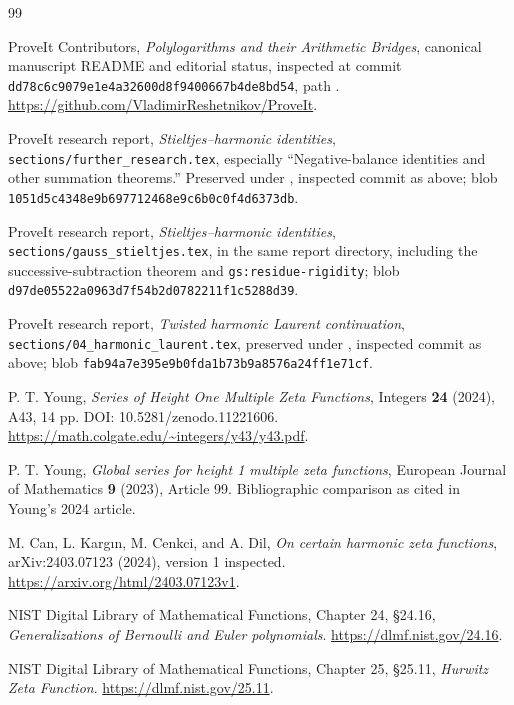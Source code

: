 \documentclass[11pt]{article}
\numberwithin{equation}{section}
\theoremstyle{definition}\newtheorem{definition}[theorem]{Definition}
\theoremstyle{remark}\newtheorem{remark}[theorem]{Remark}
\newcommand{\sourcecommit}{\texttt{dd78c6c9079e1e4a32600d8f9400667b4de8bd54}}
\begin{document}
\begin{thebibliography}{99}
ProveIt Contributors, \emph{Polylogarithms and their Arithmetic Bridges},
canonical manuscript README and editorial status, inspected at commit
\sourcecommit, path
.
\url{https://github.com/VladimirReshetnikov/ProveIt}.

ProveIt research report, \emph{Stieltjes--harmonic identities},
\texttt{sections/further\_research.tex}, especially ``Negative-balance
identities and other summation theorems.'' Preserved under
, inspected commit
as above; blob \texttt{1051d5c4348e9b697712468e9c6b0c0f4d6373db}.

ProveIt research report, \emph{Stieltjes--harmonic identities},
\texttt{sections/gauss\_stieltjes.tex}, in the same report directory,
including the successive-subtraction theorem and
\texttt{gs:residue-rigidity}; blob
\texttt{d97de05522a0963d7f54b2d0782211f1c5288d39}.

ProveIt research report, \emph{Twisted harmonic Laurent continuation},
\texttt{sections/04\_harmonic\_laurent.tex}, preserved under
, inspected commit as above;
blob \texttt{fab94a7e395e9b0fda1b73b9a8576a24ff1e71cf}.

P. T. Young, \emph{Series of Height One Multiple Zeta Functions},
Integers \textbf{24} (2024), A43, 14 pp.
DOI: 10.5281/zenodo.11221606.
\url{https://math.colgate.edu/~integers/y43/y43.pdf}.

P. T. Young, \emph{Global series for height 1 multiple zeta functions},
European Journal of Mathematics \textbf{9} (2023), Article 99.
Bibliographic comparison as cited in Young's 2024 article.

M. Can, L. Karg\i n, M. Cenkci, and A. Dil,
\emph{On certain harmonic zeta functions}, arXiv:2403.07123 (2024),
version 1 inspected.
\url{https://arxiv.org/html/2403.07123v1}.

NIST Digital Library of Mathematical Functions,
Chapter 24, \S24.16, \emph{Generalizations of Bernoulli and Euler polynomials}.
\url{https://dlmf.nist.gov/24.16}.

NIST Digital Library of Mathematical Functions,
Chapter 25, \S25.11, \emph{Hurwitz Zeta Function}.
\url{https://dlmf.nist.gov/25.11}.
\end{thebibliography}
\end{document}
